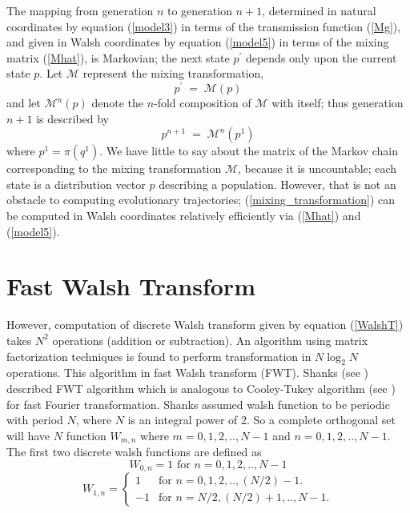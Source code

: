 The mapping from generation $n$ to generation $n+1$, determined in
natural coordinates by equation (\ref{model3}) in terms of the
transmission function (\ref{Mg}), and given in Walsh coordinates by
equation (\ref{model5}) in terms of the mixing matrix (\ref{Mhat}), is
Markovian; the next state $p^\prime$ depends only upon the current
state $p$.  Let $\mathcal{M}$ represent the mixing transformation,
\begin{equation} \label{mixing_transformation}
p^\prime \; = \; \mathcal{M}(p)
\end{equation}
and let $\mathcal{M}^n(p)$ denote the $n$-fold composition of
$\mathcal{M}$ with itself; thus generation $n+1$ is described by
\[
p^{n+1} \; = \; \mathcal{M}^n(p^1)
\]
where $p^1 = \pi (q^1)$.  We have little to say
about the matrix of the Markov chain corresponding to the mixing
transformation $\mathcal{M}$, because it is uncountable; each state is
a distribution vector $p$ describing a population. However, that is
not an obstacle to computing evolutionary trajectories;
(\ref{mixing_transformation}) can be computed in Walsh coordinates
relatively efficiently via (\ref{Mhat}) and (\ref{model5}).

\section{Fast Walsh Transform}
However, computation of discrete Walsh transform given by equation (\ref{WalshT}) takes $N^2$ operations (addition or subtraction).
An algorithm using matrix factorization techniques is found to perform transformation in $N \log_2 N$ operations.
This algorithm in fast Walsh transform (FWT). 
Shanks (see \cite{Shanks1969}) described FWT algorithm which is analogous to Cooley-Tukey algorithm (see \cite{CooleyTukey1965}) for fast Fourier transformation. Shanks assumed walsh function to be periodic with period $N$, where $N$ is an integral power of 2. So a complete orthogonal set will have $N$ function $W_{m,n}$ where $m = 0, 1, 2,.., N-1$ and $n = 0, 1, 2,.., N-1$. The first two discrete walsh functions are defined as 
\begin{equation}
\label{FWT1}
W_{0,n} = 1    \text{ for $n = 0, 1, 2,.., N-1$}
\end{equation}
\begin{equation}
\label{FWT2}
W_{1,n} = \begin{cases}
    1 & \text{for $n = 0, 1, 2,.., (N/2)-1$}.\\
    -1 & \text{for $n = N/2, (N/2)+1,.., N-1$}.
  \end{cases}
\end{equation}


